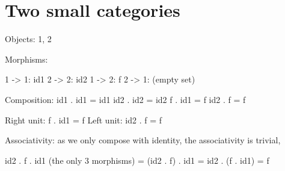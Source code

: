 \section{Two small categories}

Objects: 1, 2

Morphisms: 

1 -> 1: id1
2 -> 2: id2
1 -> 2: f
2 -> 1: (empty set)

Composition:
  id1 . id1 = id1
  id2 . id2 = id2
  f . id1 = f
  id2 . f = f

Right unit: f . id1 = f
Left unit: id2 . f = f

Associativity: as we only compose with identity, the associativity is trivial,

   id2 . f . id1 (the only 3 morphisms) = (id2 . f) . id1 = id2 . (f . id1) = f
